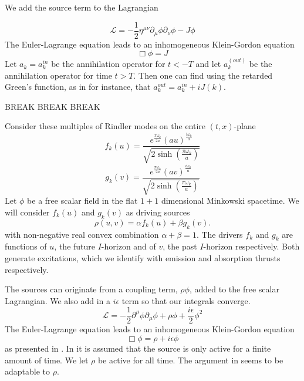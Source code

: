 \documentclass[12pt,a4paper]{article}
\begin{document}
We add the source term to the Lagrangian

\begin{equation}
\mathscr{L} = -\frac{1}{2} \eta^{\mu\nu}\partial_\mu \phi \partial_\nu \phi - J\phi
\end{equation}
The Euler-Lagrange equation leads to an inhomogeneous Klein-Gordon equation
\begin{equation}
  \Box  \phi = J
\end{equation}
Let $a_k = a_k^{in}$ be the annihilation operator for $t<-T$ and let $a_k^{(out)}$ be the annihilation operator for time $t > T$.  Then one can find using the retarded Green's function, as in \cite{beisert} for instance, that $a_k^{out} = a_k^{in} + i J(k)$.



BREAK BREAK BREAK


Consider these multiples of Rindler modes on the entire $(t,x)$-plane
\begin{equation}
f_k(u) = \frac{e^{\frac{\pi \omega_k}{2a}} {(au)}^{\frac{i\omega_k}{a}}}{ \sqrt{2\sinh\left(\frac{\pi\omega_k}{a}\right)}}
\end{equation}
\begin{equation}
g_k(v) = \frac{e^{\frac{\pi \omega_k}{2a}} {(av)}^{\frac{i\omega_k}{a}}}{ \sqrt{2\sinh\left(\frac{\pi\omega_k}{a}\right)} }
\end{equation}
Let $\phi$ be a free scalar field in the flat $1+1$ dimensional Minkowski spacetime.  We will consider $f_k(u)$ and $g_k(v)$ as driving sources
\begin{equation}
\label{ab}
\rho(u,v) = \alpha f_k(u) + \beta g_k(v).
\end{equation}
with non-negative real convex combination $\alpha + \beta = 1$. The drivers $f_k$ and $g_k$ are functions of $u$, the future $I$-horizon and of $v$, the past $I$-horizon respectively.  Both generate excitations, which we identify with emission and absorption thrusts respectively.


The sources can originate from a coupling term, $\rho \phi$, added to the free scalar Lagrangian.  We also add in a $i \epsilon$ term so that our integrals converge.
\begin{equation}
\mathscr{L} = -\frac{1}{2} \partial^\mu \phi \partial_\mu \phi + \rho\phi + \frac{i \epsilon}{2}  \phi^2
\end{equation}
The Euler-Lagrange equation leads to an inhomogeneous Klein-Gordon equation
\begin{equation}
  \Box  \phi = \rho + i \epsilon \phi
\end{equation}
as presented in \cite{beisert}.  In \cite{beisert} it is assumed that the source is only active for a finite amount of time.  We let $\rho$ be active for all time.  The argument in \cite{beisert} seems to be adaptable to $\rho$.
\end{document}

